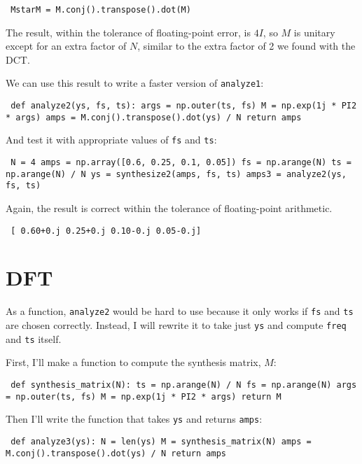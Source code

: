 \documentclass[12pt]{book} \usepackage[width=5.5in,height=8.5in, hmarginratio=3:2,vmarginratio=1:1]{geometry}
\begin{document}
\begin{verbatim} MstarM = M.conj().transpose().dot(M) \end{verbatim} 

The result, within the tolerance of floating-point error, is $4 I$, so $M$ is unitary except for an extra factor of $N$, similar to the extra factor of 2 we found with the DCT. 

We can use this result to write a faster version of {\tt analyze1}: 

\begin{verbatim} def analyze2(ys, fs, ts): args = np.outer(ts, fs) M = np.exp(1j * PI2 * args) amps = M.conj().transpose().dot(ys) / N return amps \end{verbatim} 

And test it with appropriate values of {\tt fs} and {\tt ts}: 

\begin{verbatim} N = 4 amps = np.array([0.6, 0.25, 0.1, 0.05]) fs = np.arange(N) ts = np.arange(N) / N ys = synthesize2(amps, fs, ts) amps3 = analyze2(ys, fs, ts) \end{verbatim} 

Again, the result is correct within the tolerance of floating-point arithmetic. 

\begin{verbatim} [ 0.60+0.j 0.25+0.j 0.10-0.j 0.05-0.j] \end{verbatim} 

\section{DFT} \label{dftsection} 

As a function, {\tt analyze2} would be hard to use because it only works if {\tt fs} and {\tt ts} are chosen correctly. Instead, I will rewrite it to take just {\tt ys} and compute {\tt freq} and {\tt ts} itself. 

First, I'll make a function to compute the synthesis matrix, $M$: 

\begin{verbatim} def synthesis_matrix(N): ts = np.arange(N) / N fs = np.arange(N) args = np.outer(ts, fs) M = np.exp(1j * PI2 * args) return M \end{verbatim} 

Then I'll write the function that takes {\tt ys} and returns {\tt amps}: 

\begin{verbatim} def analyze3(ys): N = len(ys) M = synthesis_matrix(N) amps = M.conj().transpose().dot(ys) / N return amps \end{verbatim} 
\end{document}
